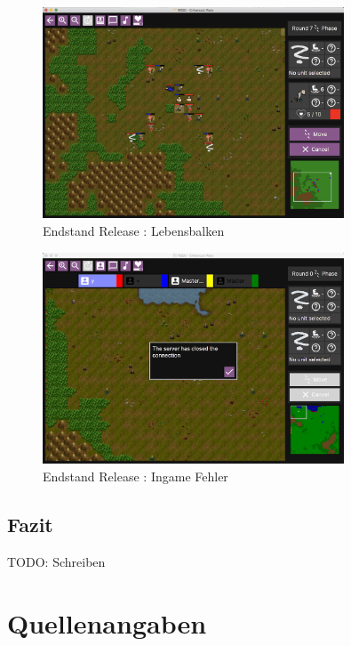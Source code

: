 \documentclass[12pt, titlepage]{scrartcl}
\newcommand{\RN}[1]{%
	\textup{\uppercase\expandafter{\romannumeral#1}}%
}
\begin{document}
				\begin{figure}[H] 
					\centering
					\includegraphics[width=0.8\textwidth]{images/endOfRelease/HealthbarDown.png}
					\caption{Endstand Release \RN{3}: Lebensbalken}
					\label{End_Healthbar_Down}
				\end{figure}
				\begin{figure}[H] 
					\centering
					\includegraphics[width=0.8\textwidth]{images/endOfRelease/Failure.png}
					\caption{Endstand Release \RN{3}: Ingame Fehler}
					\label{End_Failure}
				\end{figure}
		\subsection{Fazit}
			TODO: Schreiben
	\newpage
	\section{Quellenangaben}
		\listoffigures
		\listoftables
\end{document}
